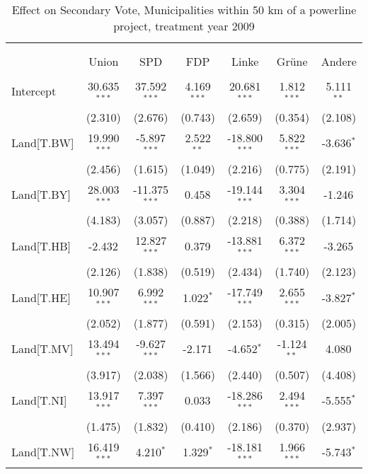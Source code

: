 \begin{table}[!htbp] \centering
  \caption{Effect on Secondary Vote, Municipalities within 50 km of a powerline project, treatment year 2009}
\begin{tabular}{@{\extracolsep{5pt}}lcccccc}
\\[-1.8ex]\hline
\hline \\[-1.8ex]
\\[-1.8ex] & \multicolumn{1}{c}{Union} & \multicolumn{1}{c}{SPD} & \multicolumn{1}{c}{FDP} & \multicolumn{1}{c}{Linke} & \multicolumn{1}{c}{Grüne} & \multicolumn{1}{c}{Andere}  \\
\hline \\[-1.8ex]
 Intercept & 30.635$^{***}$ & 37.592$^{***}$ & 4.169$^{***}$ & 20.681$^{***}$ & 1.812$^{***}$ & 5.111$^{**}$ \\
  & (2.310) & (2.676) & (0.743) & (2.659) & (0.354) & (2.108) \\
 Land[T.BW] & 19.990$^{***}$ & -5.897$^{***}$ & 2.522$^{**}$ & -18.800$^{***}$ & 5.822$^{***}$ & -3.636$^{*}$ \\
  & (2.456) & (1.615) & (1.049) & (2.216) & (0.775) & (2.191) \\
 Land[T.BY] & 28.003$^{***}$ & -11.375$^{***}$ & 0.458$^{}$ & -19.144$^{***}$ & 3.304$^{***}$ & -1.246$^{}$ \\
  & (4.183) & (3.057) & (0.887) & (2.218) & (0.388) & (1.714) \\
 Land[T.HB] & -2.432$^{}$ & 12.827$^{***}$ & 0.379$^{}$ & -13.881$^{***}$ & 6.372$^{***}$ & -3.265$^{}$ \\
  & (2.126) & (1.838) & (0.519) & (2.434) & (1.740) & (2.123) \\
 Land[T.HE] & 10.907$^{***}$ & 6.992$^{***}$ & 1.022$^{*}$ & -17.749$^{***}$ & 2.655$^{***}$ & -3.827$^{*}$ \\
  & (2.052) & (1.877) & (0.591) & (2.153) & (0.315) & (2.005) \\
 Land[T.MV] & 13.494$^{***}$ & -9.627$^{***}$ & -2.171$^{}$ & -4.652$^{*}$ & -1.124$^{**}$ & 4.080$^{}$ \\
  & (3.917) & (2.038) & (1.566) & (2.440) & (0.507) & (4.408) \\
 Land[T.NI] & 13.917$^{***}$ & 7.397$^{***}$ & 0.033$^{}$ & -18.286$^{***}$ & 2.494$^{***}$ & -5.555$^{*}$ \\
  & (1.475) & (1.832) & (0.410) & (2.186) & (0.370) & (2.937) \\
 Land[T.NW] & 16.419$^{***}$ & 4.210$^{*}$ & 1.329$^{*}$ & -18.181$^{***}$ & 1.966$^{***}$ & -5.743$^{*}$ \\

\end{tabular}
\end{table}
